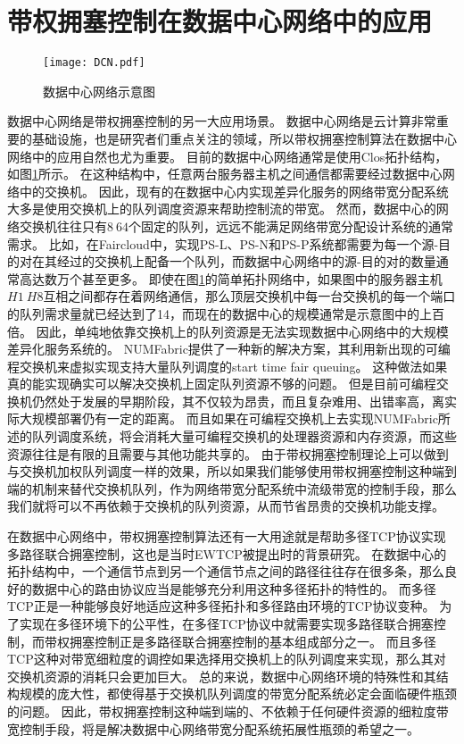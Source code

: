\documentclass[winfonts]{njuthesis}
\begin{document}
\section{带权拥塞控制在数据中心网络中的应用}\label{sec:DCN}

\begin{figure}[ht]
  \centering
  \texttt{[image: DCN.pdf]}
  \caption{数据中心网络示意图}
  \label{fig:DCN}
\end{figure}

数据中心网络是带权拥塞控制的另一大应用场景。
数据中心网络是云计算非常重要的基础设施，也是研究者们重点关注的领域，所以带权拥塞控制算法在数据中心网络中的应用自然也尤为重要。
目前的数据中心网络通常是使用Clos拓扑结构\cite{singh2015jupiter}，如图\ref{fig:DCN}所示。
在这种结构中，任意两台服务器主机之间通信都需要经过数据中心网络中的交换机。
因此，现有的在数据中心内实现差异化服务的网络带宽分配系统大多是使用交换机上的队列调度资源来帮助控制流的带宽\cite{popa2012faircloud}\cite{nagaraj2016numfabric}。
然而，数据中心的网络交换机往往只有$8~64$个固定的队列\cite{hu2018providing}，远远不能满足网络带宽分配设计系统的通常需求。
比如，在Faircloud\cite{popa2012faircloud}中，实现PS-L、PS-N和PS-P系统都需要为每一个源-目的对在其经过的交换机上配备一个队列，而数据中心网络中的源-目的对的数量通常高达数万个甚至更多。
即使在图\ref{fig:DCN}的简单拓扑网络中，如果图中的服务器主机$H1~H8$互相之间都存在着网络通信，那么顶层交换机中每一台交换机的每一个端口的队列需求量就已经达到了14，而现在的数据中心的规模通常是示意图中的上百倍\cite{singh2015jupiter}。
因此，单纯地依靠交换机上的队列资源是无法实现数据中心网络中的大规模差异化服务系统的。
NUMFabric\cite{nagaraj2016numfabric}提供了一种新的解决方案，其利用新出现的可编程交换机来虚拟实现支持大量队列调度的start time fair queuing。
这种做法如果真的能实现确实可以解决交换机上固定队列资源不够的问题。
但是目前可编程交换机仍然处于发展的早期阶段，其不仅较为昂贵，而且复杂难用、出错率高，离实际大规模部署仍有一定的距离。
而且如果在可编程交换机上去实现NUMFabric所述的队列调度系统，将会消耗大量可编程交换机的处理器资源和内存资源，而这些资源往往是有限的且需要与其他功能共享的。
由于带权拥塞控制理论上可以做到与交换机加权队列调度一样的效果\cite{popa2012faircloud}，所以如果我们能够使用带权拥塞控制这种端到端的机制来替代交换机队列，作为网络带宽分配系统中流级带宽的控制手段，那么我们就将可以不再依赖于交换机的队列资源，从而节省昂贵的交换机功能支撑。

在数据中心网络中，带权拥塞控制算法还有一大用途就是帮助多径TCP协议实现多路径联合拥塞控制\cite{Honda2009EWTCP,wischik2011design}，这也是当时EWTCP被提出时的背景研究。
在数据中心的拓扑结构中，一个通信节点到另一个通信节点之间的路径往往存在很多条，那么良好的数据中心的路由协议应当是能够充分利用这种多径拓扑的特性的\cite{greenberg2009vl2}。
而多径TCP正是一种能够良好地适应这种多径拓扑和多径路由环境的TCP协议变种。
为了实现在多径环境下的公平性，在多径TCP协议中就需要实现多路径联合拥塞控制，而带权拥塞控制正是多路径联合拥塞控制的基本组成部分之一。
而且多径TCP这种对带宽细粒度的调控如果选择用交换机上的队列调度来实现，那么其对交换机资源的消耗只会更加巨大。
总的来说，数据中心网络环境的特殊性和其结构规模的庞大性，都使得基于交换机队列调度的带宽分配系统必定会面临硬件瓶颈的问题。
因此，带权拥塞控制这种端到端的、不依赖于任何硬件资源的细粒度带宽控制手段，将是解决数据中心网络带宽分配系统拓展性瓶颈的希望之一。
\end{document}
